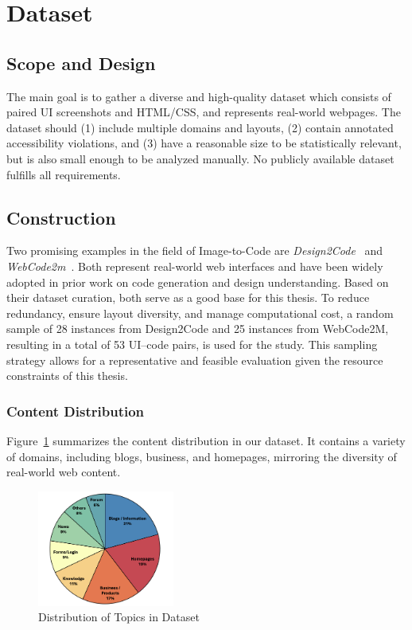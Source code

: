 \section{Dataset}
\label{subchapter:Dataset}
\subsection{Scope and Design}
The main goal is to gather a diverse and high-quality dataset which consists of 
paired UI screenshots and HTML/CSS, and represents
real-world webpages. The dataset should (1) include multiple domains and layouts,
(2) contain annotated accessibility violations, and (3) have a reasonable size to be
statistically relevant, but is also small enough to be analyzed manually.
No publicly available dataset fulfills all requirements.

\subsection{Construction}
Two promising examples in the field of Image-to-Code are \textit{Design2Code}~\parencite{si2024design2code} 
and \textit{WebCode2m}~\parencite{gui2024webcode2m}. 
Both represent real-world web
interfaces and have been widely adopted in prior work on code generation 
and design understanding. Based on their
dataset curation, both serve as a good base for this thesis.\newline
To reduce redundancy, ensure layout diversity, and manage computational cost, a random sample of
28 instances from Design2Code and 25 instances from WebCode2M, resulting in a total of 53 UI–code
pairs, is used for the study. This sampling strategy allows for a representative and feasible evaluation
given the resource constraints of this thesis.


\subsubsection{Content Distribution}
Figure~\ref{fig:dataset_distribution} summarizes the content distribution in our dataset.
It contains a variety of domains, including blogs, business, and homepages, mirroring the 
diversity of real-world web content.

\begin{figure}[htbp]
  \centering
  \includegraphics[width=0.4\textwidth]{figures/dataset_distribution.png}
  \caption{Distribution of Topics in Dataset}
  \label{fig:dataset_distribution}
\end{figure}

